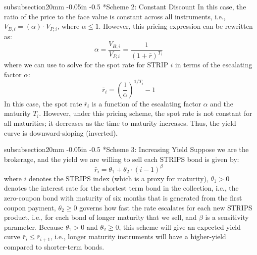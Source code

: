 \documentclass[11pt]{article}
\makeatletter
\theoremstyle{definition}
\renewcommand\subsubsection{\@startsection
	{subsubsection}{2}{0mm}
	{-0.05in}
	{-0.5\baselineskip}
	{\normalfont\normalsize\itshape\bfseries}}
\makeatother
\begin{document}
\subsubsection*{Scheme 2: Constant Discount}
In this case, the ratio of the price to the face value is constant across all instruments, i.e., $V_{B, i} = \left(\alpha\right)\cdot{V}_{P, i}$, where $\alpha\leq{1}$. However, this pricing expression can be rewritten as:
\begin{equation}
\alpha = \frac{V_{B,i}}{V_{P,i}} = \frac{1}{\left(1+\bar{r}\right)^{T_{i}}}
\end{equation}
where we can use to solve for the spot rate for STRIP $i$ in terms of the escalating factor $\alpha$:
\begin{equation}
\bar{r}_{i} = \left(\frac{1}{\alpha}\right)^{1/T_{i}} - 1
\end{equation}
In this case, the spot rate $\bar{r}_{i}$ is a function of the escalating factor $\alpha$ and the maturity $T_{i}$. 
However, under this pricing scheme, the spot rate is not constant for all maturities; it decreases as the time to maturity increases. Thus, the yield curve is downward-sloping (inverted).

\subsubsection*{Scheme 3: Increasing Yield}
Suppose we are the brokerage, and the yield we are willing to sell each STRIPS bond is given by:
\begin{equation}
\bar{r}_{i} = \theta_{1}+\theta_{2}\cdot\left(i-1\right)^{\beta}
\end{equation}
where $i$ denotes the STRIPS index (which is a proxy for maturity), 
$\theta_{1}>0$ denotes the interest rate for the shortest term bond in the collection, i.e., the zero-coupon bond with maturity of six months that is generated from the first coupon payment, $\theta_{2}\geq{0}$ governs how fast the rate escalates for each new STRIPS product, i.e., for each bond of longer maturity that we sell, and $\beta$ is a sensitivity parameter. Because $\theta_{1}>{0}$ and $\theta_{2}\geq{0}$, this scheme will give an expected yield curve $\bar{r}_{i}\leq\bar{r}_{i+1}$, i.e., longer maturity instruments will have a higher-yield compared to shorter-term bonds.
\end{document}
